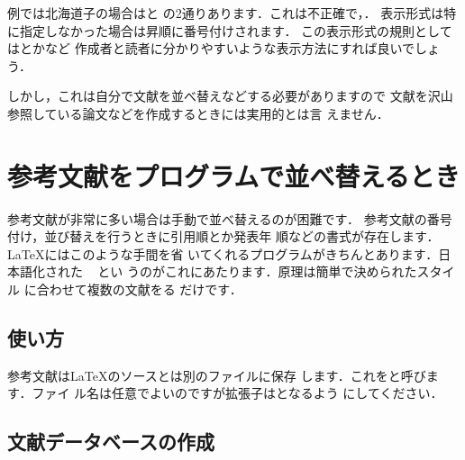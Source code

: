 例では北海道子の場合はと
%
の2通りあります．これは不正確で，．
%
表示形式は特に指定しなかった場合は昇順に番号付けされます．
この表示形式の規則としては\yo{[番号]}とか\yo{[名前 年号]}など
作成者と読者に分かりやすいような表示方法にすれば良いでしょう．

しかし，これは自分で文献を並べ替えなどする必要がありますので
文献を沢山参照している論文などを作成するときには実用的とは言
えません．

\section{参考文献をプログラムで並べ替えるとき}


参考文献が非常に多い場合は手動で並べ替えるのが困難です．
参考文献の番号付け，並び替えを行うときに引用順とか発表年
順などの書式が存在します．{\LaTeX}にはこのような手間を省
いてくれるプログラムがきちんとあります．日本語化された
\Prog[JBibTeX]{\JBibTeX}~\cite{omjbibtex,omjbtxdoc} とい
うのがこれにあたります．原理は簡単で決められたスタイル
に合わせて複数の文献をる
だけです．

\subsection{\texorpdfstring {}  の使い方}

参考文献は{\LaTeX}のソースとは別のファイルに保存
します．これをと呼びます．ファイ
ル名は任意でよいのですが拡張子は{}となるよう
にしてください．

\subsection{文献データベースの作成}
%

